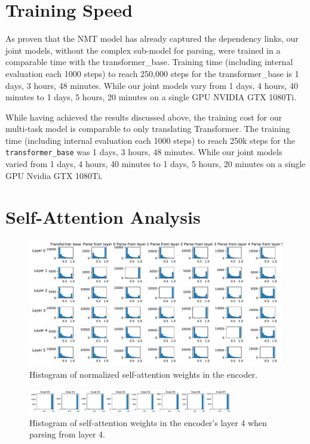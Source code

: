 \section{Training Speed}

As proven that the NMT model has already captured the dependency links, our joint models, without the complex sub-model for parsing, were trained in a comparable time with the transformer\_base. Training time (including internal evaluation each 1000 steps) to reach 250,000 steps for the transformer\_base is 1 days, 3 hours, 48 minutes. While our joint models vary from 1 days, 4 hours, 40 minutes to 1 days, 5 hours, 20 minutes on a single GPU NVIDIA GTX 1080Ti.

While having achieved the results discussed above, the training cost for our multi-task model is comparable to only translating Transformer. The training time (including internal evaluation each 1000 steps) to reach 250k steps for the \texttt{transformer\_base} was 1 days, 3 hours, 48 minutes. While our joint models varied from 1 days, 4 hours, 40 minutes to 1 days, 5 hours, 20 minutes on a single GPU Nvidia GTX 1080Ti.

\section{Self-Attention Analysis}

\begin{figure}
	\includegraphics[width=\textwidth]{img/att_dist}
    \caption{Histogram of normalized self-attention weights in the encoder.}
    \label{fig:att_dist}
\end{figure}

\begin{figure}
    \centering
	\includegraphics[width=0.8\textwidth]{img/att_dist_4}
    \caption{Histogram of self-attention weights in the encoder's layer 4 when parsing from layer 4.}
    \label{fig:att_dist_4}
\end{figure}

